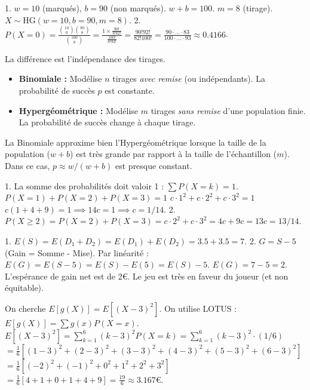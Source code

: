 \begin{correctionbox}
1. $w=10$ (marqués), $b=90$ (non marqués). $w+b=100$. $m=8$ (tirage).
$X \sim \text{HG}(w=10, b=90, m=8)$.
2. $P(X=0) = \frac{\binom{10}{0} \binom{90}{8}}{\binom{100}{8}} = \frac{1 \times \frac{90!}{8!82!}}{\frac{100!}{8!92!}} = \frac{90! 92!}{82! 100!} = \frac{90 \cdot \dots \cdot 83}{100 \cdot \dots \cdot 93} \approx 0.4166$.
\end{correctionbox}

\begin{correctionbox}
La différence est l'indépendance des tirages.
\begin{itemize}
    \item \textbf{Binomiale :} Modélise $n$ tirages \textit{avec remise} (ou indépendants). La probabilité de succès $p$ est constante.
    \item \textbf{Hypergéométrique :} Modélise $m$ tirages \textit{sans remise} d'une population finie. La probabilité de succès change à chaque tirage.
\end{itemize}
La Binomiale approxime bien l'Hypergéométrique lorsque la taille de la population ($w+b$) est très grande par rapport à la taille de l'échantillon ($m$). Dans ce cas, $p \approx w/(w+b)$ est presque constant.
\end{correctionbox}

\begin{correctionbox}
1. La somme des probabilités doit valoir 1 : $\sum P(X=k) = 1$.
$P(X=1) + P(X=2) + P(X=3) = 1$
$c \cdot 1^2 + c \cdot 2^2 + c \cdot 3^2 = 1$
$c(1 + 4 + 9) = 1 \implies 14c = 1 \implies c = 1/14$.
2. $P(X \ge 2) = P(X=2) + P(X=3) = c \cdot 2^2 + c \cdot 3^2 = 4c + 9c = 13c = 13/14$.
\end{correctionbox}

\begin{correctionbox}
1. $E(S) = E(D_1 + D_2) = E(D_1) + E(D_2) = 3.5 + 3.5 = 7$.
2. $G = S - 5$ (Gain = Somme - Mise).
Par linéarité : $E(G) = E(S - 5) = E(S) - E(5) = E(S) - 5$.
$E(G) = 7 - 5 = 2$.
L'espérance de gain net est de 2€. Le jeu est très en faveur du joueur (et non équitable).
\end{correctionbox}

\begin{correctionbox}
On cherche $E[g(X)] = E[(X-3)^2]$. On utilise LOTUS : $E[g(X)] = \sum g(x) P(X=x)$.
$E[(X-3)^2] = \sum_{k=1}^6 (k-3)^2 P(X=k) = \sum_{k=1}^6 (k-3)^2 \cdot (1/6)$
$= \frac{1}{6} \left[ (1-3)^2 + (2-3)^2 + (3-3)^2 + (4-3)^2 + (5-3)^2 + (6-3)^2 \right]$
$= \frac{1}{6} \left[ (-2)^2 + (-1)^2 + 0^2 + 1^2 + 2^2 + 3^2 \right]$
$= \frac{1}{6} [ 4 + 1 + 0 + 1 + 4 + 9 ] = \frac{19}{6} \approx 3.167€$.
\end{correctionbox}

